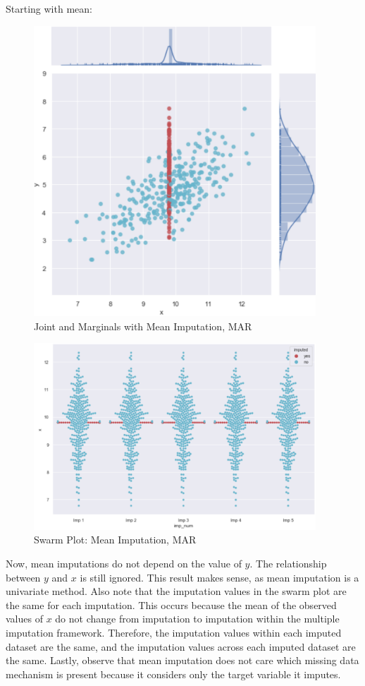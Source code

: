 \documentclass[12pt,oneside]{chicagocapstone}
\begin{document}
Starting with mean:
\begin{figure}

{\centering \includegraphics[width=400px]{figure/multi-mean-mar} 

}

\caption{Joint and Marginals with Mean Imputation, MAR}\label{fig:multi-mean-mar}
\end{figure}
\begin{figure}

{\centering \includegraphics[width=400px]{figure/swarm-mean-mar} 

}

\caption{Swarm Plot: Mean Imputation, MAR}\label{fig:swarm-mean-mar}
\end{figure}
Now, mean imputations do not depend on the value of \(y\). The
relationship between \(y\) and \(x\) is still ignored. This result makes
sense, as mean imputation is a univariate method. Also note that the
imputation values in the swarm plot are the same for each imputation.
This occurs because the mean of the observed values of \(x\) do not
change from imputation to imputation within the multiple imputation
framework. Therefore, the imputation values within each imputed dataset
are the same, and the imputation values across each imputed dataset are
the same. Lastly, observe that mean imputation does not care which
missing data mechanism is present because it considers only the target
variable it imputes.
\end{document}
